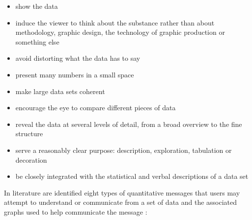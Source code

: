 \documentclass[]{book}
\providecommand{\tightlist}{%
  \setlength{\itemsep}{0pt}\setlength{\parskip}{0pt}}
\theoremstyle{definition}
\theoremstyle{definition}
\theoremstyle{definition}
\theoremstyle{remark}
\begin{document}
\begin{itemize}
\tightlist
\item
  show the data
\item
  induce the viewer to think about the substance rather than about
  methodology, graphic design, the technology of graphic production or
  something else
\item
  avoid distorting what the data has to say
\item
  present many numbers in a small space
\item
  make large data sets coherent
\item
  encourage the eye to compare different pieces of data
\item
  reveal the data at several levels of detail, from a broad overview to
  the fine structure
\item
  serve a reasonably clear purpose: description, exploration, tabulation
  or decoration
\item
  be closely integrated with the statistical and verbal descriptions of
  a data set
\end{itemize}

In literature are identified eight types of quantitative messages that
users may attempt to understand or communicate from a set of data and
the associated graphs used to help communicate the message
\citep{few2012show}:
\end{document}
